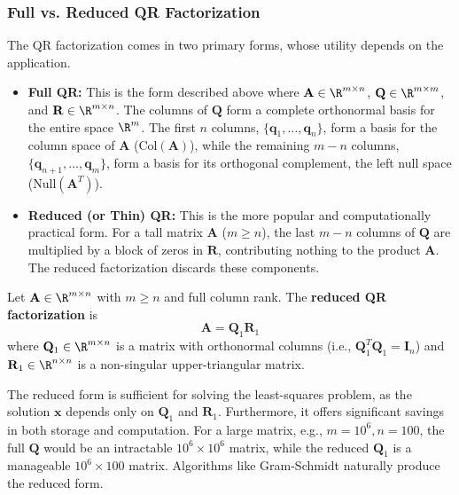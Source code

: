 \begin{proposition}
\subsubsection{Full vs. Reduced QR Factorization}
The QR factorization comes in two primary forms, whose utility depends on the application.

\begin{itemize}
    \item \textbf{Full QR:} This is the form described above where $\mathbf{A} \in \R^{m \times n}$, $\mathbf{Q} \in \R^{m \times m}$, and $\mathbf{R} \in \R^{m \times n}$. The columns of $\mathbf{Q}$ form a complete orthonormal basis for the entire space $\R^m$. The first $n$ columns, $\{\mathbf{q}_1, \dots, \mathbf{q}_n\}$, form a basis for the column space of $\mathbf{A}$ ($\text{Col}(\mathbf{A})$), while the remaining $m-n$ columns, $\{\mathbf{q}_{n+1}, \dots, \mathbf{q}_m\}$, form a basis for its orthogonal complement, the left null space ($\text{Null}(\mathbf{A}^T)$).

    \item \textbf{Reduced (or Thin) QR:} This is the more popular and computationally practical form. For a tall matrix $\mathbf{A}$ ($m \ge n$), the last $m-n$ columns of $\mathbf{Q}$ are multiplied by a block of zeros in $\mathbf{R}$, contributing nothing to the product $\mathbf{A}$. The reduced factorization discards these components.
\end{itemize}

\begin{definition}
Let $\mathbf{A} \in \R^{m \times n}$ with $m \ge n$ and full column rank. The \textbf{reduced QR factorization} is
\[ \mathbf{A} = \mathbf{Q}_1\mathbf{R}_1 \]
where $\mathbf{Q}_1 \in \R^{m \times n}$ is a matrix with orthonormal columns (i.e., $\mathbf{Q}_1^T\mathbf{Q}_1 = \mathbf{I}_n$) and $\mathbf{R}_1 \in \R^{n \times n}$ is a non-singular upper-triangular matrix.
\end{definition}

\begin{remark}
The reduced form is sufficient for solving the least-squares problem, as the solution $\mathbf{x}$ depends only on $\mathbf{Q}_1$ and $\mathbf{R}_1$. Furthermore, it offers significant savings in both storage and computation. For a large matrix, e.g., $m=10^6, n=100$, the full $\mathbf{Q}$ would be an intractable $10^6 \times 10^6$ matrix, while the reduced $\mathbf{Q}_1$ is a manageable $10^6 \times 100$ matrix. Algorithms like Gram-Schmidt naturally produce the reduced form.
\end{remark}


\end{proposition}
